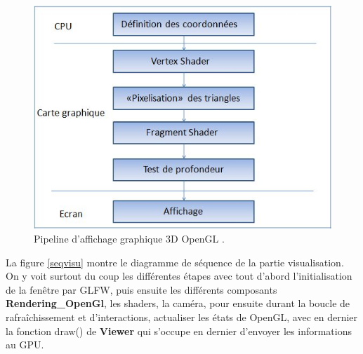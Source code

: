 \documentclass[a4paper]{article}
\begin{document}

\begin{figure}[!ht]
        \begin{center} \includegraphics[width=0.7\linewidth]{img/archi/shader_theory.jpg} \end{center}
        \caption{\label{shader_theory}Pipeline d'affichage graphique 3D OpenGL \protect\footnotemark .}
\end{figure}


La figure \ref{seqvisu} montre le diagramme de séquence de la partie visualisation. On y voit surtout du coup les différentes étapes avec tout d'abord l'initialisation de la fenêtre par GLFW, puis ensuite les différents composants \textbf{Rendering\_OpenGl}, les shaders, la caméra, pour ensuite durant la boucle de rafraîchissement et d'interactions, actualiser les états de OpenGL, avec en dernier la fonction draw() de \textbf{Viewer} qui s'occupe en dernier d'envoyer les informations au GPU.\\
\end{document}
